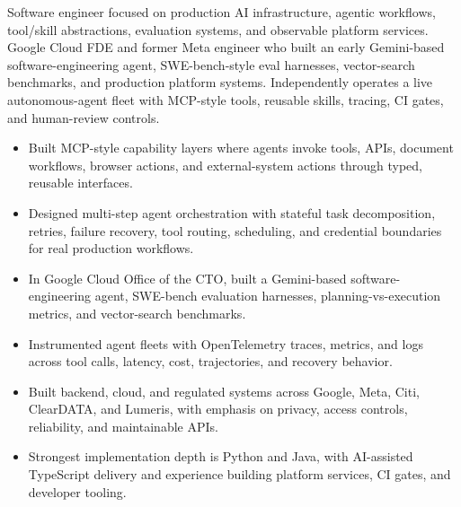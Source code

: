 


Software engineer focused on production AI infrastructure, agentic workflows, tool/skill abstractions, evaluation systems, and observable platform services. Google Cloud FDE and former Meta engineer who built an early Gemini-based software-engineering agent, SWE-bench-style eval harnesses, vector-search benchmarks, and production platform systems. Independently operates a live autonomous-agent fleet with MCP-style tools, reusable skills, tracing, CI gates, and human-review controls.
\begin{itemize}
  \item Built MCP-style capability layers where agents invoke tools, APIs, document workflows, browser actions, and external-system actions through typed, reusable interfaces.
  \item Designed multi-step agent orchestration with stateful task decomposition, retries, failure recovery, tool routing, scheduling, and credential boundaries for real production workflows.
  \item In Google Cloud Office of the CTO, built a Gemini-based software-engineering agent, SWE-bench evaluation harnesses, planning-vs-execution metrics, and vector-search benchmarks.
\end{itemize}
\begin{itemize}
  \item Instrumented agent fleets with OpenTelemetry traces, metrics, and logs across tool calls, latency, cost, trajectories, and recovery behavior.
  \item Built backend, cloud, and regulated systems across Google, Meta, Citi, ClearDATA, and Lumeris, with emphasis on privacy, access controls, reliability, and maintainable APIs.
  \item Strongest implementation depth is Python and Java, with AI-assisted TypeScript delivery and experience building platform services, CI gates, and developer tooling.
\end{itemize}




